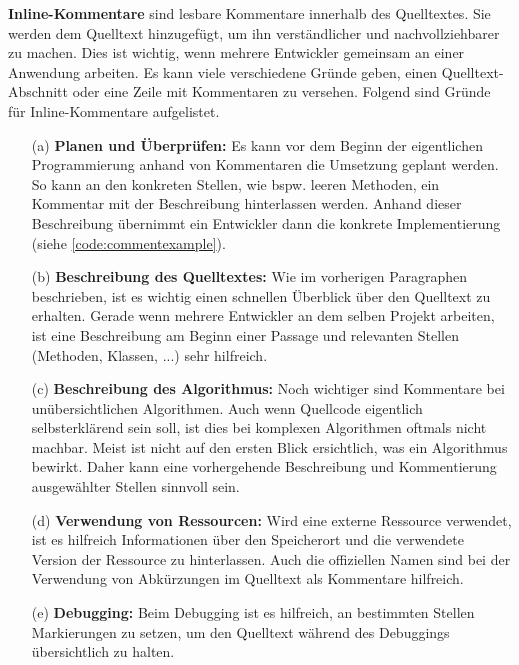 \textbf{Inline-Kommentare} sind lesbare Kommentare innerhalb des Quelltextes. Sie werden dem Quelltext hinzugefügt, um ihn verständlicher und nachvollziehbarer zu machen. Dies ist wichtig, wenn mehrere Entwickler gemeinsam an einer Anwendung arbeiten. Es kann viele verschiedene Gründe geben, einen Quelltext-Abschnitt oder eine Zeile mit Kommentaren zu versehen. Folgend sind Gründe für Inline-Kommentare aufgelistet.
\begin{itemize}
	\item[(a)] \textbf{Planen und Überprüfen:} Es kann vor dem Beginn der eigentlichen Programmierung anhand von Kommentaren die Umsetzung geplant werden. So kann an den konkreten Stellen, wie bspw. leeren Methoden, ein Kommentar mit der Beschreibung hinterlassen werden. Anhand dieser Beschreibung übernimmt ein Entwickler dann die konkrete Implementierung (siehe \autoref{code:commentexample}).
	\item[(b)] \textbf{Beschreibung des Quelltextes:} Wie im vorherigen Paragraphen beschrieben, ist es wichtig einen schnellen Überblick über den Quelltext zu erhalten. Gerade wenn mehrere Entwickler an dem selben Projekt arbeiten, ist eine Beschreibung am Beginn einer Passage und relevanten Stellen (Methoden, Klassen, ...) sehr hilfreich. 
	\item[(c)] \textbf{Beschreibung des Algorithmus:} Noch wichtiger sind Kommentare bei unübersichtlichen Algorithmen. Auch wenn Quellcode eigentlich selbsterklärend sein soll, ist dies bei komplexen Algorithmen oftmals nicht machbar. Meist ist nicht auf den ersten Blick ersichtlich, was ein Algorithmus bewirkt. Daher kann eine vorhergehende Beschreibung und Kommentierung ausgewählter Stellen sinnvoll sein.
	\item[(d)] \textbf{Verwendung von Ressourcen:} Wird eine externe Ressource verwendet, ist es hilfreich Informationen über den Speicherort und die verwendete Version der Ressource zu hinterlassen. Auch die offiziellen Namen sind bei der Verwendung von Abkürzungen im Quelltext als Kommentare hilfreich. 
	\item[(e)] \textbf{Debugging:} Beim Debugging ist es hilfreich, an bestimmten Stellen Markierungen zu setzen, um den Quelltext während des Debuggings übersichtlich zu halten. 
\end{itemize}

